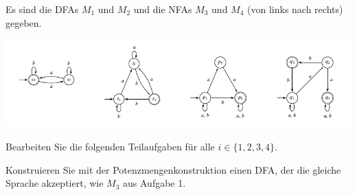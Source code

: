 \documentclass[10pt, a4paper]{exam}
\begin{document}
\begin{questions}

    \question Es sind die DFAs $M_1$ und $M_2$ und die NFAs $M_3$ und $M_4$ (von links nach rechts) gegeben.
    \begin{center}
        \includegraphics[width=1\linewidth]{Assets/ASK_uebung/u01-01.png}
    \end{center}
    Bearbeiten Sie die folgenden Teilaufgaben für alle $i\in \{1, 2, 3, 4\}$.

    \question Konstruieren Sie mit der Potenzmengenkonstruktion einen DFA, der die gleiche Sprache akzeptiert, wie $M_3$ aus Aufgabe 1.
    \begin{solution}
    \end{solution}


\end{questions}
\end{document}
